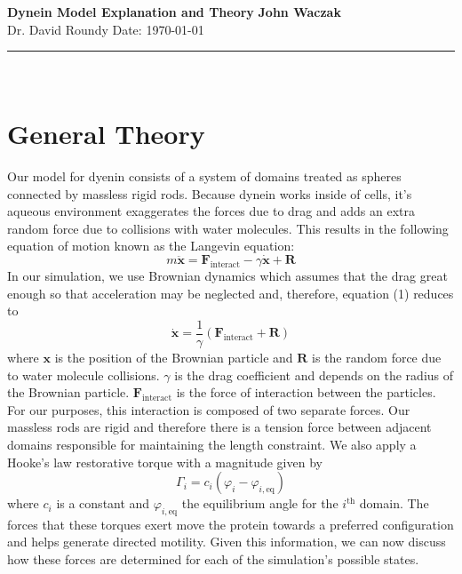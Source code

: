 \documentclass[a4paper, 11pt]{article}
\begin{document}
\noindent
\large\textbf{Dynein Model Explanation and Theory} \hfill \textbf{John Waczak} \\
\normalsize Dr. David Roundy \hfill  Date: \today \\
\par\noindent\rule{\textwidth}{0.4pt} \\


\section*{General Theory}
\noindent Our model for dyenin consists of a system of domains treated as spheres connected by massless rigid rods. Because dynein works inside of cells, it's aqueous environment exaggerates the forces due to drag and adds an extra random force due to collisions with water molecules. This results in the following equation of motion known as the Langevin equation:
\begin{equation}
  m\ddot{\mathbf{x}} = \mathbf{F}_\text{interact} -\gamma\dot{\mathbf{x}}+\mathbf{R} 
\end{equation}
In our simulation, we use Brownian dynamics which assumes that the drag great enough so that acceleration may be neglected and, therefore, equation (1) reduces to
\begin{equation}
  \dot{\mathbf{x}} = \frac{1}{\gamma}\left(\mathbf{F}_\text{interact}+\mathbf{R}\right) 
\end{equation}
where $\mathbf{x}$ is the position of the Brownian particle and $\mathbf{R}$ is the random force due to water molecule collisions. $\gamma$ is the drag coefficient and depends on the radius of the Brownian particle. $\mathbf{F}_\text{interact}$ is the force of interaction between the particles. For our purposes, this interaction is composed of two separate forces. Our massless rods are rigid and therefore there is a tension force between adjacent domains responsible for maintaining the length constraint. We also apply a Hooke's law restorative torque with a magnitude given by
\begin{equation}
  \Gamma_i = c_i(\varphi_i - \varphi_{i, \text{eq}})
\end{equation}
where $c_i$ is a constant and $\varphi_{i,\text{eq}}$ the equilibrium angle for the $i^\text{th}$ domain. The forces that these torques exert move the protein towards a preferred configuration and helps generate directed motility. Given this information, we can now discuss how these forces are determined for each of the simulation's possible states.
\pagebreak
\end{document}
